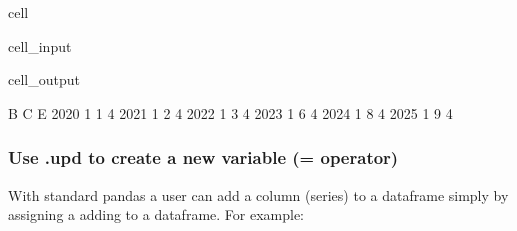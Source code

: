 \documentclass[letterpaper,10pt,english]{jupyterBook}
\begin{document}
\begin{sphinxuseclass}{cell}\begin{sphinxVerbatimInput}

\begin{sphinxuseclass}{cell_input}
\begin{sphinxVerbatim}[commandchars=\\\{\}]

   \PYG{p}{[}\PYG{p}{]}\PYG{p}{[}\PYG{p}{]}\PYG{p}{[}\PYG{p}{]}\PYG{p}{[}    \PYG{p}{]}
                  
\end{sphinxVerbatim}

\end{sphinxuseclass}\end{sphinxVerbatimInput}
\begin{sphinxVerbatimOutput}

\begin{sphinxuseclass}{cell_output}
\begin{sphinxVerbatim}[commandchars=\\\{\}]
      B  C  E
2020  1  1  4
2021  1  2  4
2022  1  3  4
2023  1  6  4
2024  1  8  4
2025  1  9  4
\end{sphinxVerbatim}

\end{sphinxuseclass}\end{sphinxVerbatimOutput}

\end{sphinxuseclass}

\subsubsection{Use .upd to create a new variable (= operator)}
\label{\detokenize{content/04_PythonEssentials/UpdateCommand:use-upd-to-create-a-new-variable-operator}}
\sphinxAtStartPar
With standard pandas a user can add a column (series) to a dataframe simply by assigning a adding to a dataframe.  For example:
\end{document}
